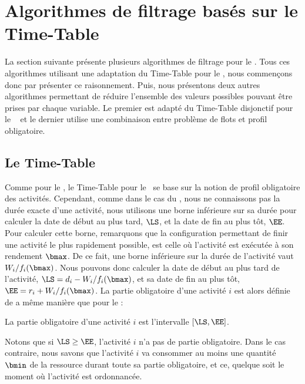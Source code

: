 
\section{Algorithmes de filtrage basés sur le Time-Table}

La section suivante présente plusieurs algorithmes de filtrage pour le
\CECSP. Tous ces algorithmes utilisant une adaptation du Time-Table
pour le \CUSP, nous commençons donc par présenter ce
raisonnement. Puis, nous présentons deux autres algorithmes permettant
de réduire l'ensemble des valeurs possibles pouvant être prises par
chaque variable. Le premier est adapté du Time-Table disjonctif pour
le \CUSP~\cite{Gay2015} et le dernier utilise une combinaison entre
problème de flots et profil obligatoire.

\subsection{Le Time-Table}
Comme pour le \CUSP, le Time-Table pour le \CECSP~se base sur la
notion de profil obligatoire des activités. Cependant, comme dans le
cas du \CECSP, nous ne connaissons pas la durée exacte d'une activité,
nous utilisons une borne inférieure sur sa durée pour calculer la date
de début au plus tard, $\LS$, et la date de fin au plus tôt,
$\EE$. Pour calculer cette borne, remarquons que la configuration
permettant de finir une activité le plus rapidement possible, est
celle où l'activité est exécutée à son rendement $\bmax$. De ce fait,
une borne inférieure sur la durée de l'activité vaut
$W_i/f_i(\bmax)$. Nous pouvons donc calculer la date de début au plus
tard de l'activité, $\LS=d_i-W_i/f_i(\bmax)$, et sa date de fin au
plus tôt, $\EE=r_i+W_i/f_i(\bmax)$. La partie obligatoire d'une
activité $i$ est alors définie de a même manière que pour le \CUSP:

\begin{defi}
La partie obligatoire d'une activité $i$ est l'intervalle $[\LS,\EE]$.
\end{defi}

Notons que si $\LS \ge \EE$, l'activité $i$ n'a pas de partie
obligatoire. Dans le cas contraire, nous savons que l'activité $i$ va
consommer au moins une quantité $\bmin$ de la ressource durant toute
sa partie obligatoire, et ce, quelque soit le moment où l'activité est
ordonnancée. 


